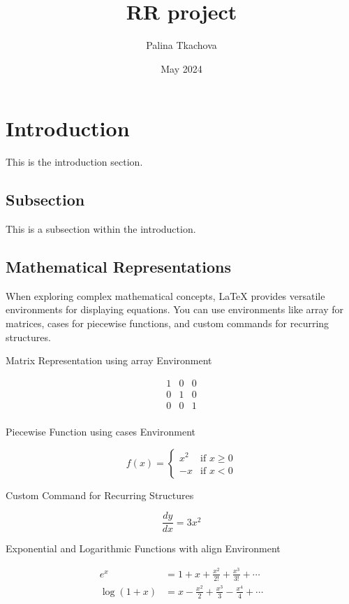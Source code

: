 \documentclass{article}
\title{RR project}
\author{Palina Tkachova}
\date{May 2024}
\begin{document}
\maketitle

\section{Introduction}

This is the introduction section.

\subsection{Subsection}

This is a subsection within the introduction.

\subsection{Mathematical Representations}

When exploring complex mathematical concepts, LaTeX provides versatile environments for displaying equations. You can use environments like array for matrices, cases for piecewise functions, and custom commands for recurring structures.

Matrix Representation using array Environment

\[
\begin{array}{ccc}
1 & 0 & 0 \\
0 & 1 & 0 \\
0 & 0 & 1 \\
\end{array}
\]

Piecewise Function using cases Environment

\[
f(x) = 
\begin{cases} 
x^2 & \text{if } x \geq 0 \\
-x & \text{if } x < 0 
\end{cases}
\]

Custom Command for Recurring Structures

\newcommand{\diff}[2]{\frac{d #1}{d #2}}
\[
\diff{y}{x} = 3x^2
\]

Exponential and Logarithmic Functions with align Environment

\begin{align}
    e^x &= 1 + x + \frac{x^2}{2!} + \frac{x^3}{3!} + \cdots \\
    \log(1+x) &= x - \frac{x^2}{2} + \frac{x^3}{3} - \frac{x^4}{4} + \cdots
\end{align}
\end{document}
